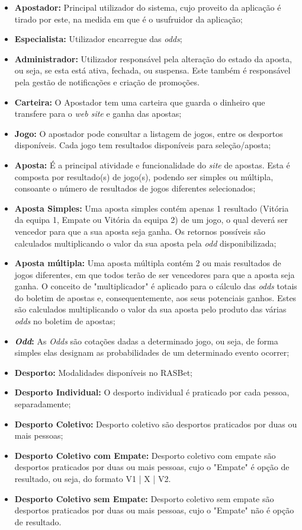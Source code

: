 \begin{itemize}
    \item \textbf{Apostador:} Principal utilizador do sistema, cujo proveito da aplicação é tirado por este, na medida em que é o usufruidor da aplicação;
    \item \textbf{Especialista:} Utilizador encarregue das \textit{odds};
    \item \textbf{Administrador:}  Utilizador responsável pela alteração do estado da aposta, ou seja, se esta está ativa, fechada, ou suspensa. Este também é responsável pela gestão de notificações e criação de promoções.
    \item \textbf{Carteira:} O Apostador tem uma carteira que guarda o dinheiro que transfere para o \textit{web site} e ganha das apostas;
    \item \textbf{Jogo:} O apostador pode consultar a listagem de jogos, entre os desportos disponíveis. Cada jogo tem resultados disponíveis para seleção/aposta;
    \item \textbf{Aposta:} É a principal atividade e funcionalidade do \textit{site} de apostas. Esta é composta por resultado(s) de jogo(s), podendo ser simples ou múltipla, consoante o número de resultados de jogos diferentes selecionados; 
    \item \textbf{Aposta Simples:} Uma aposta simples contém apenas 1 resultado (Vitória da equipa 1, Empate ou Vitória da equipa 2) de um jogo, o qual deverá ser vencedor para que a sua aposta seja ganha. Os retornos possíveis são calculados multiplicando o valor da sua aposta pela \textit{odd} disponibilizada;
    \item \textbf{Aposta múltipla:} Uma aposta múltipla contém 2 ou mais resultados de jogos diferentes, em que todos terão de ser vencedores para que a aposta seja ganha. O conceito de "multiplicador" é aplicado para o cálculo das \textit{odds} totais do boletim de apostas e, consequentemente, aos seus potenciais ganhos. Estes são calculados multiplicando o valor da sua aposta pelo produto das várias \textit{odds} no boletim de apostas;
    \item \textbf{\textit{Odd}:}  As \textit{Odds} são cotações dadas a determinado jogo, ou seja, de forma simples elas designam as probabilidades de um determinado evento ocorrer;
    \item \textbf{Desporto:} Modalidades disponíveis no RASBet;
    \item \textbf{Desporto Individual:} O desporto individual é  praticado por cada pessoa, separadamente;
    \item \textbf{Desporto Coletivo:} Desporto coletivo são desportos praticados por duas ou mais pessoas;
    \item \textbf{Desporto Coletivo com Empate:} Desporto coletivo com empate são desportos praticados por duas ou mais pessoas, cujo o "Empate" é opção de resultado, ou seja, do formato V1 | X | V2. 
    \item \textbf{Desporto Coletivo sem Empate:} Desporto coletivo sem empate são desportos praticados por duas ou mais pessoas, cujo o "Empate" não é opção de resultado.
    

\end{itemize}
